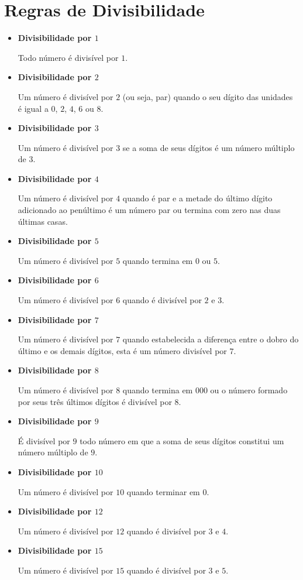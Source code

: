  \newpage
 \section{Regras de Divisibilidade}
 \begin{itemize}
  \item \textbf{Divisibilidade por $1$}

 Todo número é divisível por $1$.

 \item \textbf{Divisibilidade por $2$}

 Um número é divisível por $2$ (ou seja, par) quando o seu dígito das unidades é igual a $0$, $2$, $4$, $6$ ou $8$.

 \item \textbf{Divisibilidade por $3$}

 Um número é divisível por $3$ se a soma de seus dígitos é um número múltiplo de $3$.

 \item \textbf{Divisibilidade por $4$}

 Um número é divisível por $4$ quando é par e a metade do último dígito adicionado ao penúltimo é um número par ou termina com zero nas duas últimas casas.

 \item \textbf{Divisibilidade por $5$}

 Um número é divisível por $5$ quando termina em $0$ ou $5$.

 \item \textbf{Divisibilidade por $6$}

 Um número é divisível por $6$ quando é divisível por $2$ e $3$.

 \item \textbf{Divisibilidade por $7$}

 Um número é divisível por $7$ quando estabelecida a diferença entre o dobro do último e os demais dígitos, esta é um número divisível por $7$.

 \item \textbf{Divisibilidade por $8$}

 Um número é divisível por $8$ quando termina em $000$ ou o número formado por seus três últimos dígitos é divisível por $8$.

 \item \textbf{Divisibilidade por $9$}

 É divisível por $9$ todo número em que a soma de seus dígitos constitui um número múltiplo de $9$.

 \item \textbf{Divisibilidade por $10$}

 Um número é divisível por $10$ quando terminar em $0$.

 \item \textbf{Divisibilidade por $12$}

 Um número é divisível por $12$ quando é divisível por $3$ e $4$.

 \item \textbf{Divisibilidade por $15$}

 Um número é divisível por $15$ quando é divisível por $3$ e $5$.
 \end{itemize}

